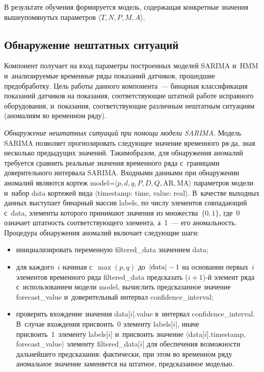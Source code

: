 \begin{multicols}{2}
      В результате обучения формируется модель, содержащая конкретные 
значения вышеупомянутых параметров $\langle T, N, P, M, A\rangle$.

\subsection{Обнаружение нештатных ситуаций}

      Компонент получает на вход параметры построенных моделей SARIMA 
и~HMM и~анализируемые временные ряды показаний датчиков, прошедшие 
предобработку. Цель работы данного компонента~--- бинарная классификация 
показаний датчиков на показания, соответствующие штатной работе 
исправного оборудования, и~показания, соответствующие различным 
нештатным ситуациям (аномалиям во временн$\acute{\mbox{о}}$м ряду). 
      
      
      \textit{Обнаружение нештатных ситуаций при помощи модели 
SARIMA.} Модель SARIMA позволяет прогнозировать следующее значение 
временн$\acute{\mbox{о}}$го ря-\linebreak да, зная несколько предыдущих значений. 
Таким\linebreak образом, для 
обнаружения аномалий требуется сравнить реальные значения временн$\acute{\mbox{о}}$го 
ряда с~границами доверительного интервала SARIMA. Входными данными при 
обнаружении аномалий являются кортеж {model}\;=\;$\langle p, d, q, P, D, 
Q, \mathrm{AR}, \mathrm{MA}\rangle$\linebreak
 па\-ра\-мет\-ров модели и~набор {data} кортежей вида 
$\langle${timestamp}: {time}, {value}: {real}$\rangle$. 
В~качестве выходных данных выступает бинарный массив {labels}, по 
числу элементов совпадающий с~{data}, элементы которого принимают 
значения из множества~$\{0, 1\}$, где~0 означает штатность соответствующего 
элемента, а~1~--- его аномальность. Процедура обнаружения 
аномалий включает следующие шаги: 
      \begin{itemize}
\item инициализировать переменную {filtered\_data} значением 
{data};
\item для каждого~$i$ начиная с~$\max(p, q)$  
до~$\vert \mathrm{data}\vert\hm-1$ на основании первых~$i$ элементов 
временного ряда {filtered\_data} предсказать ($i+1$)-й элемент ряда 
с~использованием модели {model}, вычислить предсказанное значение 
{forecast\_value} и~доверительный интервал {confidence\_interval};
\item проверить вхождение значения {data}[$i$].{value} 
в~интервал {confidence\_interval}. В~случае вхож\-дения присвоить~0 
элементу {labels}[$i$], иначе\linebreak
 присвоить~1~элементу {labels}[$i$] 
и~присвоить значение $\langle${data}[$i$].{timestamp}, 
{forecast\_value}$\rangle$ элементу {filtered\_data}[$i$] для 
обеспечения воз\-мож\-ности дальнейшего предсказания: фактически, при этом 
во временн$\acute{\mbox{о}}$м ряду аномальное значение заменяется на штатное, 
предсказанное мо\-делью.
\end{itemize}
      

\end{multicols}
